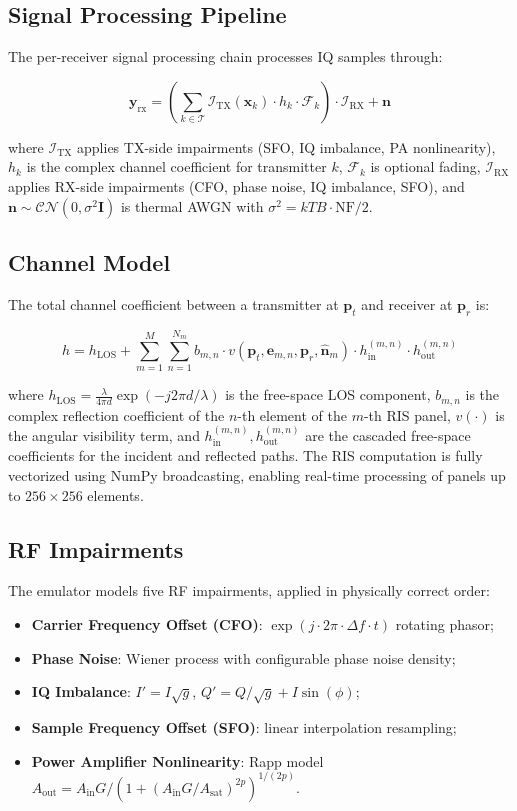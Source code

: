 \documentclass{article}
\begin{document}
\subsection{Signal Processing Pipeline}

The per-receiver signal processing chain processes IQ samples through:

\[
\mathbf{y}_{\text{rx}} = \left(\sum_{k \in \mathcal{T}} \mathcal{I}_{\text{TX}}(\mathbf{x}_k) \cdot h_k \cdot \mathcal{F}_k\right) \cdot \mathcal{I}_{\text{RX}} + \mathbf{n}
\]

where $\mathcal{I}_{\text{TX}}$ applies TX-side impairments (SFO, IQ imbalance, PA nonlinearity), $h_k$ is the complex channel coefficient for transmitter $k$, $\mathcal{F}_k$ is optional fading, $\mathcal{I}_{\text{RX}}$ applies RX-side impairments (CFO, phase noise, IQ imbalance, SFO), and $\mathbf{n} \sim \mathcal{CN}(0, \sigma^2\mathbf{I})$ is thermal AWGN with $\sigma^2 = kT B \cdot \text{NF} / 2$.

\subsection{Channel Model}

The total channel coefficient between a transmitter at $\mathbf{p}_t$ and receiver at $\mathbf{p}_r$ is:

\[
h = h_{\text{LOS}} + \sum_{m=1}^{M} \sum_{n=1}^{N_m} b_{m,n} \cdot v(\mathbf{p}_t, \mathbf{e}_{m,n}, \mathbf{p}_r, \mathbf{\hat{n}}_m) \cdot h_{\text{in}}^{(m,n)} \cdot h_{\text{out}}^{(m,n)}
\]

where $h_{\text{LOS}} = \frac{\lambda}{4\pi d}\exp(-j2\pi d/\lambda)$ is the free-space LOS component, $b_{m,n}$ is the complex reflection coefficient of the $n$-th element of the $m$-th RIS panel, $v(\cdot)$ is the angular visibility term, and $h_{\text{in}}^{(m,n)}, h_{\text{out}}^{(m,n)}$ are the cascaded free-space coefficients for the incident and reflected paths. The RIS computation is fully vectorized using NumPy broadcasting, enabling real-time processing of panels up to $256 \times 256$ elements.

\subsection{RF Impairments}

The emulator models five RF impairments, applied in physically correct order:

\begin{itemize}
    \item \textbf{Carrier Frequency Offset (CFO)}: $\exp(j \cdot 2\pi \cdot \Delta f \cdot t)$ rotating phasor;
    \item \textbf{Phase Noise}: Wiener process with configurable phase noise density;
    \item \textbf{IQ Imbalance}: $I' = I\sqrt{g}$, $Q' = Q/\sqrt{g} + I\sin(\phi)$;
    \item \textbf{Sample Frequency Offset (SFO)}: linear interpolation resampling;
    \item \textbf{Power Amplifier Nonlinearity}: Rapp model $A_{\text{out}} = A_{\text{in}}G / (1 + (A_{\text{in}}G/A_{\text{sat}})^{2p})^{1/(2p)}$.
\end{itemize}
\end{document}
